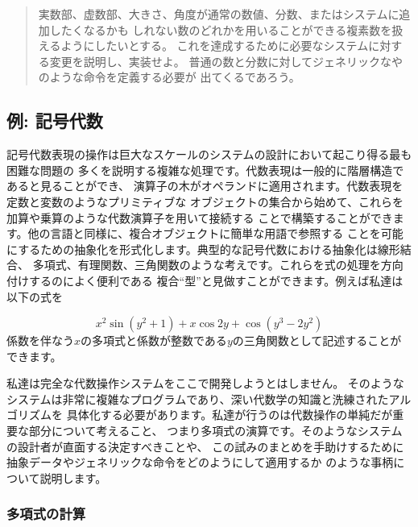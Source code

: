 \begin{quote}
実数部、虚数部、大きさ、角度が通常の数値、分数、またはシステムに追加したくなるかも
しれない数のどれかを用いることができる複素数を扱えるようにしたいとする。
これを達成するために必要なシステムに対する変更を説明し、実装せよ。
普通の数と分数に対してジェネリックなやのような命令を定義する必要が
出てくるであろう。
\end{quote}

\subsection{例: 記号代数}
\label{Section 2.5.3}


記号代数表現の操作は巨大なスケールのシステムの設計において起こり得る最も困難な問題の
多くを説明する複雑な処理です。代数表現は一般的に階層構造であると見ることができ、
演算子の木がオペランドに適用されます。代数表現を定数と変数のようなプリミティブな
オブジェクトの集合から始めて、これらを加算や乗算のような代数演算子を用いて接続する
ことで構築することができます。他の言語と同様に、複合オブジェクトに簡単な用語で参照する
ことを可能にするための抽象化を形式化します。典型的な記号代数における抽象化は線形結合、
多項式、有理関数、三角関数のような考えです。これらを式の処理を方向付けするのによく便利である
複合``型''と見做すことができます。例えば私達は以下の式を
\begin{comment}

\begin{example}
x^2 sin (y^2 + 1) + x cos 2y + cos(y^3 - 2y^2)
\end{example}

\end{comment}
\begin{displaymath}
 x^2 \sin (y^2 + 1) + x \cos 2y + \cos(y^3 - 2y^2) 
\end{displaymath}
\noindent
係数を伴なう\( x \)の多項式と係数が整数である\( y \)の三角関数として記述することが
できます。


私達は完全な代数操作システムをここで開発しようとはしません。
そのようなシステムは非常に複雑なプログラムであり、深い代数学の知識と洗練されたアルゴリズムを
具体化する必要があります。私達が行うのは代数操作の単純だが重要な部分について考えること、
つまり多項式の演算です。そのようなシステムの設計者が直面する決定すべきことや、
この試みのまとめを手助けするために抽象データやジェネリックな命令をどのようにして適用するか
のような事柄について説明します。

\subsubsection*{多項式の計算}

